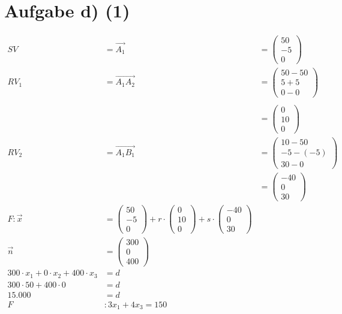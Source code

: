 \documentclass[12pt,a4paper]{report}
\begin{document}
\section{Aufgabe d) (1)}
\begin{align*}
	SV &= \overrightarrow{A_1} &= \begin{pmatrix}
		50\\-5\\0
	\end{pmatrix}\\
	RV_1 &= \overrightarrow{A_1A_2} &= \begin{pmatrix}
		50 - 50\\ 5+5 \\ 0-0
	\end{pmatrix}\\ \\
	&&= \begin{pmatrix}
		0 \\10 \\ 0
	\end{pmatrix} \\
	RV_2 &= \overrightarrow{A_1B_1} &= \begin{pmatrix}
		10 - 50 \\ -5 - (-5)\\ 30 -0 
	\end{pmatrix}\\
	&&= \begin{pmatrix}
		-40 \\ 0 \\ 30
	\end{pmatrix} \\
	F: \overrightarrow{x} &= \begin{pmatrix}
		50\\-5\\0
	\end{pmatrix} + r \cdot \begin{pmatrix}
		0 \\ 10 \\0
	\end{pmatrix} + s \cdot \begin{pmatrix}
 		-40 \\ 0 \\ 30	
	\end{pmatrix} \\
	\overrightarrow{n} &= \begin{pmatrix}
		300 \\ 0 \\ 400
	\end{pmatrix} \\
	300 \cdot x_1 + 0 \cdot x_2 + 400 \cdot x_3 &= d \\
	300 \cdot 50 + 400 \cdot 0 &= d \\
	15.000 &= d \\
	F&: 3x_1 + 4x_3 = 150 \\
\end{align*}
\end{document}
